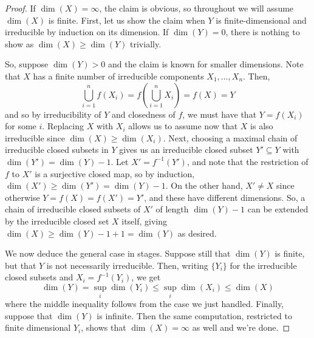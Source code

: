 \begin{proof}
	If $\dim(X) = \infty$, the claim is obvious, so throughout we will assume $\dim(X)$ is finite. First, let us show the claim when $Y$ is finite-dimensional and irreducible by induction on its dimension. If $\dim(Y) = 0$, there is nothing to show as $\dim(X) \geq \dim(Y)$ trivially.
	
	So, suppose $\dim(Y) > 0$ and the claim is known for smaller dimensions. Note that $X$ has a finite number of irreducible components $X_1,\ldots,X_n$. Then,
	\[ \bigcup_{i=1}^n f(X_i) = f\left(\bigcup_{i=1}^n X_i\right) = f(X) = Y \]
	and so by irreducibility of $Y$ and closedness of $f$, we must have that $Y = f(X_i)$ for some $i$. Replacing $X$ with $X_i$ allows us to assume now that $X$ is also irreducible since $\dim(X) \geq \dim(X_i)$. Next, choosing a maximal chain of irreducible closed subsets in $Y$ gives us an irreducible closed subset $Y' \subseteq Y$ with $\dim(Y') = \dim(Y)-1$. Let $X' = f^{-1}(Y')$, and note that the restriction of $f$ to $X'$ is a surjective closed map, so by induction, $\dim(X') \geq \dim(Y') = \dim(Y)-1$. On the other hand, $X' \neq X$ since otherwise $Y = f(X) = f(X') = Y'$, and these have different dimensions. So, a chain of irreducible closed subsets of $X'$ of length $\dim(Y)-1$ can be extended by the irreducible closed set $X$ itself, giving $\dim(X) \geq \dim(Y)-1 + 1 = \dim(Y)$ as desired.
	
	We now deduce the general case in stages. Suppose still that $\dim(Y)$ is finite, but that $Y$ is not necessarily irreducible. Then, writing $\{Y_i\}$ for the irreducible closed subsets and $X_i = f^{-1}(Y_i)$, we get
	\[ \dim(Y) = \sup_i \dim(Y_i) \leq \sup_i \dim(X_i) \leq \dim(X) \]
	where the middle inequality follows from the case we just handled. Finally, suppose that $\dim(Y)$ is infinite. Then the same computation, restricted to finite dimensional $Y_i$, shows that $\dim(X) = \infty$ as well and we're done.
\end{proof}
